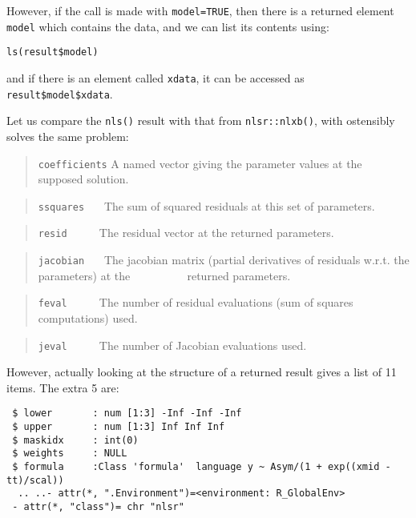 \documentclass[
]{article}
\begin{document}
However, if the call is made with \texttt{model=TRUE}, then there is a
returned element \texttt{model} which contains the data, and we can list
its contents using:

\begin{verbatim}
ls(result$model)
\end{verbatim}

and if there is an element called \texttt{xdata}, it can be accessed as
\texttt{result\$model\$xdata}.

Let us compare the \texttt{nls()} result with that from
\texttt{nlsr::nlxb()}, with ostensibly solves the same problem:

\begin{quote}
\texttt{coefficients} A named vector giving the parameter values at the
supposed solution.
\end{quote}

\begin{quote}
\texttt{ssquares} \(~~~~~\) The sum of squared residuals at this set of
parameters.
\end{quote}

\begin{quote}
\texttt{resid} \(~~~~~~~~~~\) The residual vector at the returned
parameters.
\end{quote}

\begin{quote}
\texttt{jacobian} \(~~~~~\) The jacobian matrix (partial derivatives of
residuals w.r.t. the parameters) at the \newline
\(~~~~~~~~~~~~~~~~~~~~\) returned parameters.
\end{quote}

\begin{quote}
\texttt{feval} \(~~~~~~~~~~\) The number of residual evaluations (sum of
squares computations) used.
\end{quote}

\begin{quote}
\texttt{jeval} \(~~~~~~~~~~\) The number of Jacobian evaluations used.
\end{quote}

However, actually looking at the structure of a returned result gives a
list of 11 items. The extra 5 are:

\begin{verbatim}
 $ lower       : num [1:3] -Inf -Inf -Inf
 $ upper       : num [1:3] Inf Inf Inf
 $ maskidx     : int(0) 
 $ weights     : NULL
 $ formula     :Class 'formula'  language y ~ Asym/(1 + exp((xmid - tt)/scal))
  .. ..- attr(*, ".Environment")=<environment: R_GlobalEnv> 
 - attr(*, "class")= chr "nlsr"
\end{verbatim}
\end{document}

